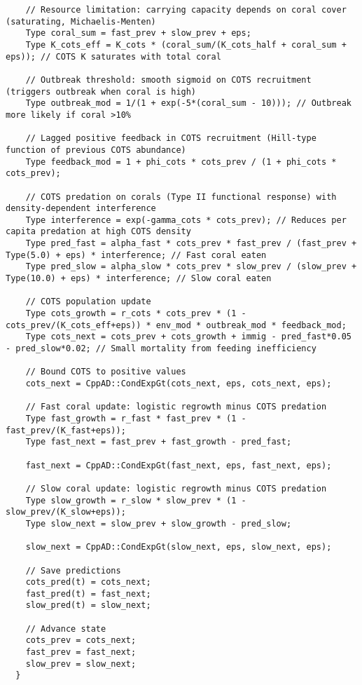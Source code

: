 \begin{lstlisting}
    // Resource limitation: carrying capacity depends on coral cover (saturating, Michaelis-Menten)
    Type coral_sum = fast_prev + slow_prev + eps;
    Type K_cots_eff = K_cots * (coral_sum/(K_cots_half + coral_sum + eps)); // COTS K saturates with total coral

    // Outbreak threshold: smooth sigmoid on COTS recruitment (triggers outbreak when coral is high)
    Type outbreak_mod = 1/(1 + exp(-5*(coral_sum - 10))); // Outbreak more likely if coral >10%

    // Lagged positive feedback in COTS recruitment (Hill-type function of previous COTS abundance)
    Type feedback_mod = 1 + phi_cots * cots_prev / (1 + phi_cots * cots_prev);

    // COTS predation on corals (Type II functional response) with density-dependent interference
    Type interference = exp(-gamma_cots * cots_prev); // Reduces per capita predation at high COTS density
    Type pred_fast = alpha_fast * cots_prev * fast_prev / (fast_prev + Type(5.0) + eps) * interference; // Fast coral eaten
    Type pred_slow = alpha_slow * cots_prev * slow_prev / (slow_prev + Type(10.0) + eps) * interference; // Slow coral eaten

    // COTS population update
    Type cots_growth = r_cots * cots_prev * (1 - cots_prev/(K_cots_eff+eps)) * env_mod * outbreak_mod * feedback_mod;
    Type cots_next = cots_prev + cots_growth + immig - pred_fast*0.05 - pred_slow*0.02; // Small mortality from feeding inefficiency

    // Bound COTS to positive values
    cots_next = CppAD::CondExpGt(cots_next, eps, cots_next, eps);

    // Fast coral update: logistic regrowth minus COTS predation
    Type fast_growth = r_fast * fast_prev * (1 - fast_prev/(K_fast+eps));
    Type fast_next = fast_prev + fast_growth - pred_fast;

    fast_next = CppAD::CondExpGt(fast_next, eps, fast_next, eps);

    // Slow coral update: logistic regrowth minus COTS predation
    Type slow_growth = r_slow * slow_prev * (1 - slow_prev/(K_slow+eps));
    Type slow_next = slow_prev + slow_growth - pred_slow;

    slow_next = CppAD::CondExpGt(slow_next, eps, slow_next, eps);

    // Save predictions
    cots_pred(t) = cots_next;
    fast_pred(t) = fast_next;
    slow_pred(t) = slow_next;

    // Advance state
    cots_prev = cots_next;
    fast_prev = fast_next;
    slow_prev = slow_next;
  }


\end{lstlisting}

